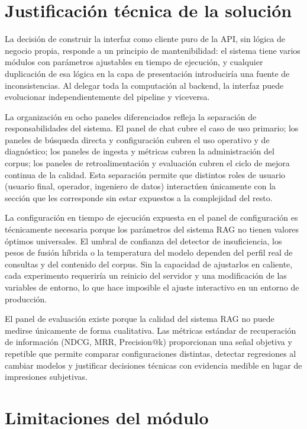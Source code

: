 \documentclass[11pt]{article}
\begin{document}
\section{Justificación técnica de la solución}

La decisión de construir la interfaz como cliente puro de la API, sin lógica de negocio
propia, responde a un principio de mantenibilidad: el sistema tiene varios módulos con
parámetros ajustables en tiempo de ejecución, y cualquier duplicación de esa lógica en la
capa de presentación introduciría una fuente de inconsistencias. Al delegar toda la
computación al backend, la interfaz puede evolucionar independientemente del pipeline y
viceversa.

La organización en ocho paneles diferenciados refleja la separación de responsabilidades del
sistema. El panel de chat cubre el caso de uso primario; los paneles de búsqueda directa y
configuración cubren el uso operativo y de diagnóstico; los paneles de ingesta y métricas
cubren la administración del corpus; los paneles de retroalimentación y evaluación cubren el
ciclo de mejora continua de la calidad. Esta separación permite que distintos roles de usuario
(usuario final, operador, ingeniero de datos) interactúen únicamente con la sección que les
corresponde sin estar expuestos a la complejidad del resto.

La configuración en tiempo de ejecución expuesta en el panel de configuración es técnicamente
necesaria porque los parámetros del sistema RAG no tienen valores óptimos universales. El
umbral de confianza del detector de insuficiencia, los pesos de fusión híbrida o la temperatura
del modelo dependen del perfil real de consultas y del contenido del corpus. Sin la capacidad
de ajustarlos en caliente, cada experimento requeriría un reinicio del servidor y una
modificación de las variables de entorno, lo que hace imposible el ajuste interactivo en un
entorno de producción.

El panel de evaluación existe porque la calidad del sistema RAG no puede medirse únicamente
de forma cualitativa. Las métricas estándar de recuperación de información (NDCG, MRR,
Precision@k) proporcionan una señal objetiva y repetible que permite comparar configuraciones
distintas, detectar regresiones al cambiar modelos y justificar decisiones técnicas con
evidencia medible en lugar de impresiones subjetivas.

\section{Limitaciones del módulo}
\end{document}
